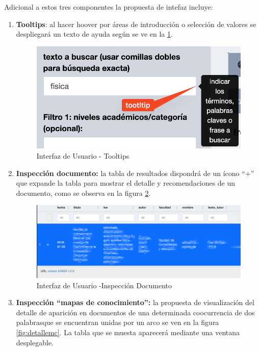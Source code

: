 \documentclass[
  12pt,
  openany]{book}
\begin{document}
Adicional a estos tres componentes la propuesta de intefaz incluye:

\begin{enumerate}
\def\labelenumi{\arabic{enumi}.}
\item
  \textbf{Tooltips}: al hacer hoover por áreas de introducción o selección de valores se despliegará un texto de ayuda según se ve en la \ref{fig:tooltip}.

  \begin{figure}

  {\centering \includegraphics[width=0.3\linewidth]{images/05-desarrollo/4_ciclo/UI/tooltip} 

  }

  \caption{Interfaz de Usuario - Tooltips }\label{fig:tooltip}
  \end{figure}
\item
  \textbf{Inspección documento:} la tabla de resultados dispondrá de un ícono ``+'' que expande la tabla para mostrar el detalle y recomendaciones de un documento, como se observa en la figura \ref{fig:detalledoc}.

  \begin{figure}

  {\centering \includegraphics[width=0.8\linewidth]{images/05-desarrollo/4_ciclo/UI/uiinspecciontabla} 

  }

  \caption{Interfaz de Usuario -Inspección Documento }\label{fig:detalledoc}
  \end{figure}
\item
  \textbf{Inspección ``mapas de conocimiento'':} la propuesta de visualización del detalle de aparición en documentos de una determinada coocurrencia de dos palabrasque se encuentran unidas por un arco se ven en la figura \ref{fig:detallemc}. La tabla que se muesta aparecerá mediante una ventana desplegable.


\end{enumerate}
\end{document}
